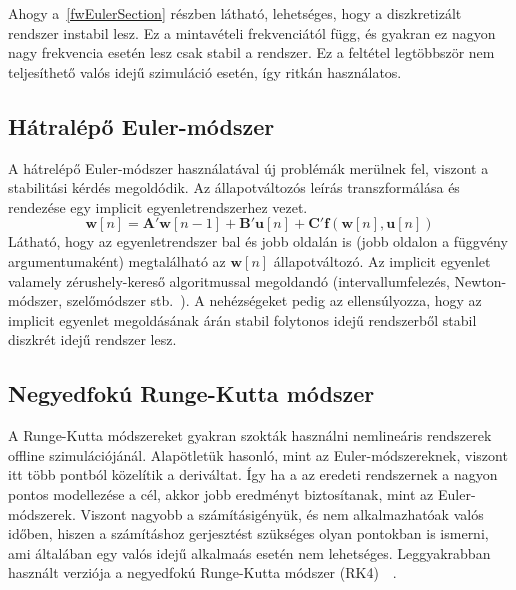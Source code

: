 Ahogy a~\ref{fwEulerSection} részben látható, lehetséges, hogy a diszkretizált rendszer instabil lesz. Ez a mintavételi frekvenciától függ, és gyakran ez nagyon nagy frekvencia esetén lesz csak stabil a rendszer. Ez a feltétel legtöbbször nem teljesíthető valós idejű szimuláció esetén, így ritkán használatos.

\subsection{Hátralépő Euler-módszer}
A hátrelépő Euler-módszer használatával új problémák merülnek fel, viszont a stabilitási kérdés megoldódik. 
Az állapotváltozós leírás transzformálása és rendezése egy implicit egyenletrendszerhez vezet.
\begin{equation}
    \mathbf{w}[n]=\mathbf{A'}\mathbf{w}[n-1]+\mathbf{B'u}[n]+\mathbf{C'f}(\mathbf{w}[n],\mathbf{u}[n])
\end{equation}
Látható, hogy az egyenletrendszer bal és jobb oldalán is (jobb oldalon a függvény argumentumaként) megtalálható az $\mathbf{w}[n]$ állapotváltozó. Az implicit egyenlet valamely zérushely-kereső algoritmussal megoldandó 
(intervallumfelezés, Newton-módszer, szelőmódszer stb.~\cite{bookNewton}). A nehézségeket pedig az ellensúlyozza, hogy az implicit egyenlet megoldásának árán stabil folytonos idejű rendszerből stabil diszkrét idejű rendszer lesz.

\subsection{Negyedfokú Runge-Kutta módszer}
A Runge-Kutta módszereket gyakran szokták használni nemlineáris rendszerek offline szimulációjánál. Alapötletük hasonló, mint az Euler-módszereknek, viszont itt több pontból közelítik a deriváltat. Így ha a az eredeti rendszernek a nagyon pontos modellezése a cél, akkor jobb eredményt biztosítanak, mint az Euler-módszerek. Viszont nagyobb a számításigényük, és nem alkalmazhatóak valós időben, hiszen a számításhoz gerjesztést szükséges olyan pontokban is ismerni, ami általában egy valós idejű alkalmaás esetén nem lehetséges. Leggyakrabban használt verziója a negyedfokú Runge-Kutta módszer (RK4)~\cite{rkk}~\cite{rungekutta}.

